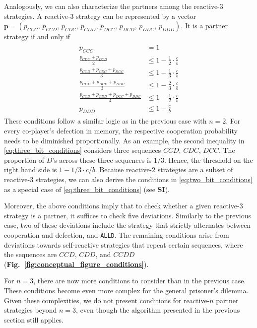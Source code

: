 \documentclass[9pt,twocolumn,twoside]{pnas-new}
\newcommand{\figref}[1]{{\textbf{Fig.~\ref{#1}}}}
\def\alld{\texttt{ALLD}}
\def\SI{\textbf{SI}}
\begin{document}
Analogously, we can also characterize the partners among the reactive-3 strategies. 
A reactive-3 strategy can be represented by a vector 
$
\mathbf{p} = (p_{CCC},\, p_{CCD},\, p_{CDC},\, p_{CDD},\, p_{DCC},\, p_{DCD},\, p_{DDC},\, p_{DDD}).
$
It is a partner strategy if and only if
\begin{align}\label{eq:three_bit_conditions}
\begin{split}
p_{CCC} & = 1 \\[0.2cm]
\frac{p_{CDC} + p_{DCD}}{2} & \leq 1 - \frac{1}{2} \cdot \frac{c}{b} \\[0.2cm]
\frac{p_{CCD} + p_{CDC} + p_{DCC}}{3} & \leq 1 - \frac{1}{3} \cdot \frac{c}{b} \\[0.2cm]
\frac{p_{CDD} + p_{DCD} + p_{DDC}}{3} & \leq 1 - \frac{2}{3} \cdot \frac{c}{b} \\[0.2cm]
\frac{p_{CCD} + p_{CDD} + p_{DCC} + p_{DDC}}{4}  & \leq 1 - \frac{1}{2} \cdot \frac{c}{b}  \\[0.2cm]
p_{DDD} & \leq 1\!-\! \frac{c}{b}
\end{split}
\end{align}
These conditions follow a similar logic as in the previous case with $n\!=\!2$.
For every co-player's defection in memory, the respective cooperation probability needs to be diminished proportionally. 
As an example, the second inequality in \eqref{eq:three_bit_conditions} considers three sequences $CCD$, $CDC$, $DCC$. 
The proportion of $D$'s across these three sequences is $1/3$. 
Hence, the threshold on the right hand side is $1\!-\!1/3\!\cdot\!c/b$. 
Because reactive-2 strategies are a subset of reactive-3 strategies, we can also derive the conditions in \eqref{eq:two_bit_conditions} as a special case of \eqref{eq:three_bit_conditions} (see \SI). 

Moreover, the above conditions imply that to check whether a given reactive-3 strategy is a
partner, it suffices to check five deviations. Similarly to the previous case,
two of these deviations include the strategy that strictly alternates between
cooperation and defection, and \alld. The remaining conditions arise from
deviations towards self-reactive strategies that repeat certain sequences, where the
sequences are \(CCD\), \(CDD\), and \(CCDD\) (\figref{fig:conceptual_figure_conditions}).

For $n\!=\!3$, there are now more conditions to consider than in the previous
case. 
These conditions become even more complex for the general prisoner's
dilemma. Given these complexities, we do not present conditions for reactive-$n$
partner strategies beyond $n\!=\!3$, even though the algorithm presented in the
previous section still applies.
\end{document}
